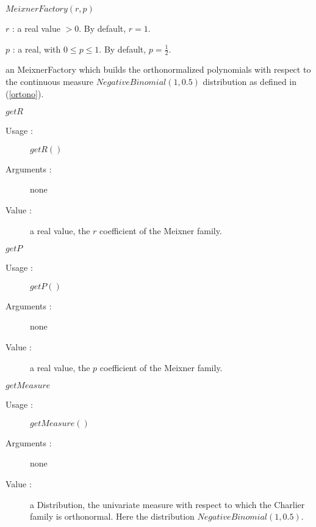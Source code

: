 \begin{description}
\item[Usage :] $MeixnerFactory(r,p)$


\item[Arguments :]   \rule{0pt}{1em}
  \begin{description}
  \item $r$ : a real value $>0$. By default, $r=1$.
  \item $p$ : a real, with $0 \leq p \leq 1$. By default, $p=\displaystyle \frac{1}{2}$.
  \end{description}


\item[Value :]  an MeixnerFactory which builds the orthonormalized polynomials with respect to the continuous measure $NegativeBinomial(1, 0.5)$ distribution as defined in (\ref{ortono}).

\item[Some methods :]  \rule{0pt}{1em}

  \begin{description}

  \item $getR$
    \begin{description}
    \item[Usage :] $getR()$
    \item[Arguments :] none
    \item[Value :]  a real value, the $r$ coefficient of the Meixner family.
    \end{description}
    \bigskip

  \item $getP$
    \begin{description}
    \item[Usage :] $getP()$
    \item[Arguments :] none
    \item[Value :]  a real value, the $p$ coefficient of the Meixner family.
    \end{description}
    \bigskip

  \item $getMeasure$
    \begin{description}
    \item[Usage :] $getMeasure()$
    \item[Arguments :] none
    \item[Value :]  a Distribution, the univariate measure with respect to which the Charlier family is orthonormal. Here the  distribution $Negative Binomial(1, 0.5)$.
    \end{description}
  \end{description}
\end{description}




